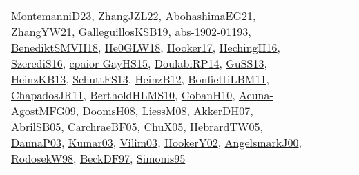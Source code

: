 {\begin{longtable}{llp{6cm}p{6cm}p{6cm}}
\href{articles/MontemanniD23.pdf}{MontemanniD23}\cite{MontemanniD23}, \href{papers/ZhangJZL22.pdf}{ZhangJZL22}\cite{ZhangJZL22}, \href{articles/AbohashimaEG21.pdf}{AbohashimaEG21}\cite{AbohashimaEG21}, \href{articles/ZhangYW21.pdf}{ZhangYW21}\cite{ZhangYW21}, \href{papers/GalleguillosKSB19.pdf}{GalleguillosKSB19}\cite{GalleguillosKSB19}, \href{articles/abs-1902-01193.pdf}{abs-1902-01193}\cite{abs-1902-01193}, \href{papers/BenediktSMVH18.pdf}{BenediktSMVH18}\cite{BenediktSMVH18}, \href{papers/He0GLW18.pdf}{He0GLW18}\cite{He0GLW18}, \href{papers/Hooker17.pdf}{Hooker17}\cite{Hooker17}, \href{papers/HechingH16.pdf}{HechingH16}\cite{HechingH16}, \href{papers/SzerediS16.pdf}{SzerediS16}\cite{SzerediS16}, \href{papers/cpaior-GayHS15.pdf}{cpaior-GayHS15}\cite{cpaior-GayHS15}, \href{papers/DoulabiRP14.pdf}{DoulabiRP14}\cite{DoulabiRP14}, \href{papers/GuSS13.pdf}{GuSS13}\cite{GuSS13}, \href{papers/HeinzKB13.pdf}{HeinzKB13}\cite{HeinzKB13}, \href{papers/SchuttFS13.pdf}{SchuttFS13}\cite{SchuttFS13}, \href{papers/HeinzB12.pdf}{HeinzB12}\cite{HeinzB12}, \href{papers/BonfiettiLBM11.pdf}{BonfiettiLBM11}\cite{BonfiettiLBM11}, \href{papers/ChapadosJR11.pdf}{ChapadosJR11}\cite{ChapadosJR11}, \href{papers/BertholdHLMS10.pdf}{BertholdHLMS10}\cite{BertholdHLMS10}, \href{papers/CobanH10.pdf}{CobanH10}\cite{CobanH10}, \href{papers/Acuna-AgostMFG09.pdf}{Acuna-AgostMFG09}\cite{Acuna-AgostMFG09}, \href{papers/DoomsH08.pdf}{DoomsH08}\cite{DoomsH08}, \href{articles/LiessM08.pdf}{LiessM08}\cite{LiessM08}, \href{papers/AkkerDH07.pdf}{AkkerDH07}\cite{AkkerDH07}, \href{papers/AbrilSB05.pdf}{AbrilSB05}\cite{AbrilSB05}, \href{papers/CarchraeBF05.pdf}{CarchraeBF05}\cite{CarchraeBF05}, \href{papers/ChuX05.pdf}{ChuX05}\cite{ChuX05}, \href{papers/HebrardTW05.pdf}{HebrardTW05}\cite{HebrardTW05}, \href{papers/DannaP03.pdf}{DannaP03}\cite{DannaP03}, \href{papers/Kumar03.pdf}{Kumar03}\cite{Kumar03}, \href{papers/Vilim03.pdf}{Vilim03}\cite{Vilim03}, \href{papers/HookerY02.pdf}{HookerY02}\cite{HookerY02}, \href{papers/AngelsmarkJ00.pdf}{AngelsmarkJ00}\cite{AngelsmarkJ00}, \href{papers/RodosekW98.pdf}{RodosekW98}\cite{RodosekW98}, \href{papers/BeckDF97.pdf}{BeckDF97}\cite{BeckDF97}, \href{papers/Simonis95.pdf}{Simonis95}\cite{Simonis95}\\

\end{longtable}}
